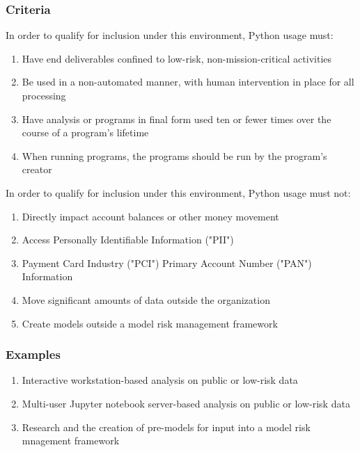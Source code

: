 		\subsubsection{Criteria}

			In order to qualify for inclusion under this environment, Python usage must:

			\begin{enumerate}
        		\item Have end deliverables confined to low-risk, non-mission-critical activities
        		\item Be used in a non-automated manner, with human intervention in place for all processing
        		\item Have analysis or programs in final form used ten or fewer times over the course of a program's lifetime
        		\item When running programs, the programs should be run by the program's creator
        	\end{enumerate}

			In order to qualify for inclusion under this environment, Python usage must not:

			\begin{enumerate}
        		\item Directly impact account balances or other money movement
        		\item Access Personally Identifiable Information ("PII")
        		\item Payment Card Industry ("PCI") Primary Account Number ("PAN") Information
        		\item Move significant amounts of data outside the organization
        		\item Create models outside a model risk management framework
        	\end{enumerate}

		\subsubsection{Examples}

			\begin{enumerate}
        		\item Interactive workstation-based analysis on public or low-risk data
        		\item Multi-user Jupyter notebook server-based analysis on public or low-risk data
        		\item Research and the creation of pre-models for input into a model risk mnagement framework
        	\end{enumerate}


